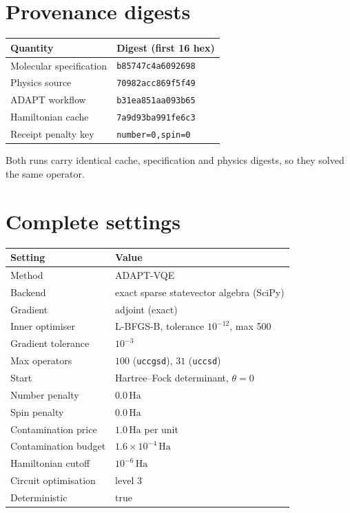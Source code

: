 \documentclass[11pt,a4paper]{article}
\newcommand{\Ha}{\ensuremath{\,\mathrm{Ha}}}
\newcommand{\code}[1]{\texttt{\small #1}}
\begin{document}
\appendix

\section{Provenance digests}

\begin{center}
\small
\begin{tabular}{ll}
\toprule
Quantity & Digest (first 16 hex) \\
\midrule
Molecular specification & \code{b85747c4a6092698} \\
Physics source          & \code{70982acc869f5f49} \\
ADAPT workflow          & \code{b31ea851aa093b65} \\
Hamiltonian cache       & \code{7a9d93ba991fe6c3} \\
Receipt penalty key     & \code{number=0,spin=0} \\
\bottomrule
\end{tabular}
\end{center}

Both runs carry identical cache, specification and physics digests, so they
solved the same operator.

\section{Complete settings}

\begin{center}
\small
\begin{tabular}{ll}
\toprule
Setting & Value \\
\midrule
Method                  & ADAPT-VQE \\
Backend                 & exact sparse statevector algebra (SciPy) \\
Gradient                & adjoint (exact) \\
Inner optimiser         & L-BFGS-B, tolerance $10^{-12}$, max 500 \\
Gradient tolerance      & $10^{-3}$ \\
Max operators           & $100$ (\code{uccgsd}), $31$ (\code{uccsd}) \\
Start                   & Hartree--Fock determinant, $\theta = 0$ \\
Number penalty          & $0.0\Ha$ \\
Spin penalty            & $0.0\Ha$ \\
Contamination price     & $1.0\Ha$ per unit \\
Contamination budget    & $1.6\times10^{-4}\Ha$ \\
Hamiltonian cutoff      & $10^{-6}\Ha$ \\
Circuit optimisation    & level 3 \\
Deterministic           & true \\
\bottomrule
\end{tabular}
\end{center}
\end{document}
